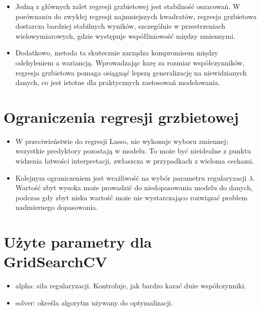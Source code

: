 \begin{itemize}
\item Jedną z głównych zalet regresji grzbietowej jest stabilność oszacowań. W porównaniu do zwykłej regresji najmniejszych kwadratów, regresja grzbietowa dostarcza bardziej stabilnych wyników, szczególnie w przestrzeniach wielowymiarowych, gdzie występuje współliniowość między zmiennymi. 

\item Dodatkowo, metoda ta skutecznie zarządza kompromisem między odchyleniem a wariancją. Wprowadzając karę za rozmiar współczynników, regresja grzbietowa pomaga osiągnąć lepszą generalizację na niewidzianych danych, co jest istotne dla praktycznych zastosowań modelowania.
\end{itemize}

{}
\section*{Ograniczenia regresji grzbietowej}
\vspace{-1.0em}
\label{sec:ml_challenges}


\begin{itemize}
\item W przeciwieństwie do regresji Lasso, nie wykonuje wyboru zmiennej; wszystkie predyktory pozostają w modelu. To może być nieidealne z punktu widzenia łatwości interpretacji, zwłaszcza w przypadkach z wieloma cechami.

\item Kolejnym ograniczeniem jest wrażliwość na wybór parametru regularyzacji $\lambda$. Wartość zbyt wysoka może prowadzić do niedopasowania modelu do danych, podczas gdy zbyt niska wartość może nie wystarczająco rozwiązać problem nadmiernego dopasowania.
\end{itemize}

{}
\section*{Użyte parametry dla GridSearchCV \cite{url_Ridge, url_grid_search}}
\vspace{-1.0em}
\label{sec:ml_challenges}

\begin{itemize}
\item {alpha}: siła regularyzacji. Kontroluje, jak bardzo karać duże współczynniki.

\item {solver}: określa algorytm używany do optymalizacji.
\end{itemize}
\noindent\makebox[\linewidth]{\rule{\paperwidth}{0.4pt}}